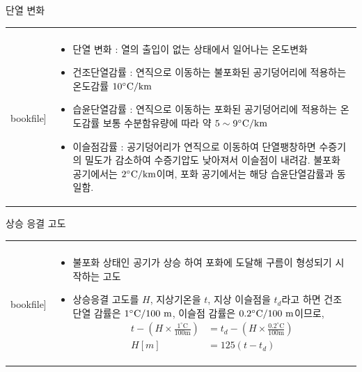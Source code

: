 \begin{frame}[t]{단열 변화}
	\begin{tabular}{ll}
		\begin{minipage}[t]{.4\textwidth}
			\begin{figure}{}
				\texttt{[image: \\bookfile]} 
			\end{figure}
		\end{minipage}
		&
		\begin{minipage}[t]{.55\textwidth}	
			\begin{itemize} \scriptsize 
				\item 	단열 변화 : 열의 출입이 없는 상태에서 일어나는 온도변화
				\item 	건조단열감률 : 연직으로 이동하는 불포화된 공기덩어리에 적용하는 온도감률 $10 \rm{{^\circ}C/km}$
				\item 	습윤단열감률 : 연직으로 이동하는 포화된 공기덩어리에 적용하는 온도감률 보통 수분함유량에 따라 약 $5\sim9 \rm{{^\circ}C/km}$
				\item 	이슬점감률 : 공기덩어리가 연직으로 이동하여 단열팽창하면 수증기의 밀도가 감소하여 수증기압도 낮아져서 이슬점이 내려감. 불포화 공기에서는 $2 \rm{{^\circ}C/km}$이며, 포화 공기에서는 해당 습윤단열감률과 동일함. 
			\end{itemize}	

		\end{minipage}
	\end{tabular}
\end{frame}



\begin{frame}[t]{상승 응결 고도}
	\begin{tabular}{ll}
		\begin{minipage}[t]{.4\textwidth}
			\begin{figure}{}
				\texttt{[image: \\bookfile]} 
			\end{figure}
		\end{minipage}
		&
		\begin{minipage}[t]{.55\textwidth}
			\begin{itemize} \scriptsize 
				\item 불포화 상태인 공기가 상승 하여 포화에 도달해 구름이 형성되기 시작하는 고도
				\item 상승응결 고도를 $H$, 지상기온을 $t$, 지상 이슬점을 $t_d$라고 하면 건조 단열 감률은 $1 \rm{{^\circ}C/100~m}$, 이슬점 감률은 $0.2 \rm{{^\circ}C/100~m}$이므로, 
				$${\displaystyle {
					\begin{aligned}
					t-\left(H \times \frac{1^{\circ} \mathrm{C}}{100 \mathrm{m}}\right)&=t_{d}-\left(H \times \frac{0.2^{\circ} \mathrm{C}}{100 \mathrm{m}}\right) \\
					H[{m}]&=125\left({t}-{t}_{d}\right)
					\end{aligned}
				}	}$$
			\end{itemize}			
		\end{minipage}
	\end{tabular}
\end{frame}




